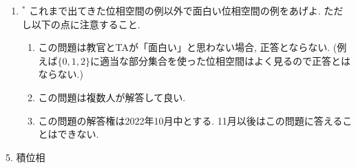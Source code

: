 \documentclass[dvipdfmx,a4paper,11pt]{article}
\theoremstyle{definition}
\begin{document}
\begin{enumerate}[ label=\textbf{問}4.\arabic*]
\item  $^{*}$ これまで出てきた位相空間の例以外で面白い位相空間の例をあげよ. ただし以下の点に注意すること.
	\begin{enumerate}
	\item この問題は教官とTAが「面白い」と思わない場合, 正答とならない. (例えば$\{ 0,1,2\}$に適当な部分集合を使った位相空間はよく見るので正答とはならない.)
	\item この問題は複数人が解答して良い.
	\item この問題の解答権は2022年10月中とする. 11月以後はこの問題に答えることはできない. 
	\end{enumerate}

 \end{enumerate}



\newpage


\begin{center}
{\Large 5. 積位相}
\end{center}
\end{document}
